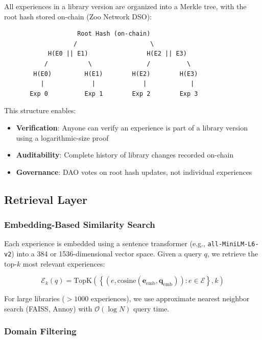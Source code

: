 All experiences in a library version are organized into a Merkle tree, with the root hash stored on-chain (Zoo Network DSO):

\begin{verbatim}
                    Root Hash (on-chain)
                   /                    \
            H(E0 || E1)                H(E2 || E3)
           /           \               /          \
        H(E0)         H(E1)        H(E2)        H(E3)
          |             |             |            |
       Exp 0          Exp 1        Exp 2        Exp 3
\end{verbatim}

This structure enables:
\begin{itemize}
    \item \textbf{Verification}: Anyone can verify an experience is part of a library version using a logarithmic-size proof
    \item \textbf{Auditability}: Complete history of library changes recorded on-chain
    \item \textbf{Governance}: DAO votes on root hash updates, not individual experiences
\end{itemize}

\subsection{Retrieval Layer}

\subsubsection{Embedding-Based Similarity Search}

Each experience is embedded using a sentence transformer (e.g., \texttt{all-MiniLM-L6-v2}) into a 384 or 1536-dimensional vector space. Given a query $q$, we retrieve the top-$k$ most relevant experiences:

\begin{equation}
\mathcal{E}_k(q) = \text{TopK}\left( \left\{ (e, \text{cosine}(\mathbf{e}_{\text{emb}}, \mathbf{q}_{\text{emb}})) : e \in \mathcal{E} \right\}, k \right)
\end{equation}

For large libraries ($>1000$ experiences), we use approximate nearest neighbor search (FAISS, Annoy) with $\mathcal{O}(\log N)$ query time.

\subsubsection{Domain Filtering}

